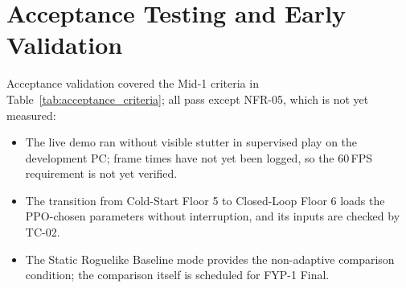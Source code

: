 \section{Acceptance Testing and Early Validation}
Acceptance validation covered the Mid-1 criteria in Table~\ref{tab:acceptance_criteria}; all pass except NFR-05, which is not yet measured:
\begin{itemize}
    \item The live demo ran without visible stutter in supervised play on the development PC; frame times have not yet been logged, so the 60\,FPS requirement is not yet verified.
    \item The transition from Cold-Start Floor 5 to Closed-Loop Floor 6 loads the PPO-chosen parameters without interruption, and its inputs are checked by TC-02.
    \item The Static Roguelike Baseline mode provides the non-adaptive comparison condition; the comparison itself is scheduled for FYP-1 Final.
\end{itemize}

